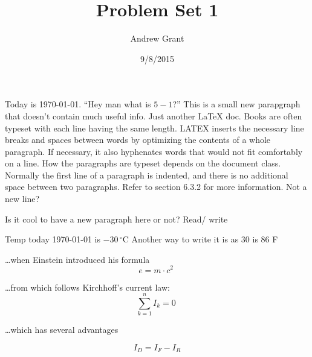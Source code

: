 \documentclass{article}
\title{Problem Set 1}
\author{Andrew Grant}
\date{9/8/2015}
\begin{document}
\maketitle

Today is \today. \newline
``Hey man what is $5 - 1$?''\newline
This is a small new parapgraph that doesn't contain much useful info. Just another \LaTeX{} doc.
Books are often typeset with each line having the same length. LATEX 
inserts the necessary line breaks and spaces between words by optimizing the contents of a whole paragraph. If necessary, it also hyphenates words that would not fit comfortably on a line. How the paragraphs are typeset depends on the document class. Normally the first line of a paragraph is indented, and there is no additional space between two paragraphs. Refer to section 6.3.2 for more information.
Not a new line?

Is it cool to have a new paragraph here or not? Read\slash{} write\newline

Temp today  \today{} is $-30\, ^{\circ}\mathrm{C}$\newline
Another way to write it is as 30 \textcelsius{} is 86 \textdegree{}F
\newline
\newline
\newline
\newline

\ldots when Einstein introduced his formula
\begin{equation}
e = m \cdot c^2 \;
\end{equation}

\ldots from which follows Kirchhoff's current law:
\begin{equation}
\sum_{k=1}^{n} I_k = 0\;
\end{equation}

\ldots which has several advantages

\begin{equation}
I_D = I_F - I_R
\end{equation}
\end{document}
